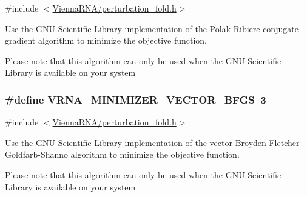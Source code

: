 {\ttfamily \#include $<$\hyperlink{perturbation__fold_8h}{Vienna\+R\+N\+A/perturbation\+\_\+fold.\+h}$>$}



Use the G\+NU Scientific Library implementation of the Polak-\/\+Ribiere conjugate gradient algorithm to minimize the objective function. 

Please note that this algorithm can only be used when the G\+NU Scientific Library is available on your system 
\subsubsection[{\texorpdfstring{V\+R\+N\+A\+\_\+\+M\+I\+N\+I\+M\+I\+Z\+E\+R\+\_\+\+V\+E\+C\+T\+O\+R\+\_\+\+B\+F\+GS}{VRNA_MINIMIZER_VECTOR_BFGS}}]{\setlength{\rightskip}{0pt plus 5cm}\#define V\+R\+N\+A\+\_\+\+M\+I\+N\+I\+M\+I\+Z\+E\+R\+\_\+\+V\+E\+C\+T\+O\+R\+\_\+\+B\+F\+GS~3}\hypertarget{group__perturbation_ga9be8a702cddf58235571ace11cc41b22}{}\label{group__perturbation_ga9be8a702cddf58235571ace11cc41b22}


{\ttfamily \#include $<$\hyperlink{perturbation__fold_8h}{Vienna\+R\+N\+A/perturbation\+\_\+fold.\+h}$>$}



Use the G\+NU Scientific Library implementation of the vector Broyden-\/\+Fletcher-\/\+Goldfarb-\/\+Shanno algorithm to minimize the objective function. 

Please note that this algorithm can only be used when the G\+NU Scientific Library is available on your system 
